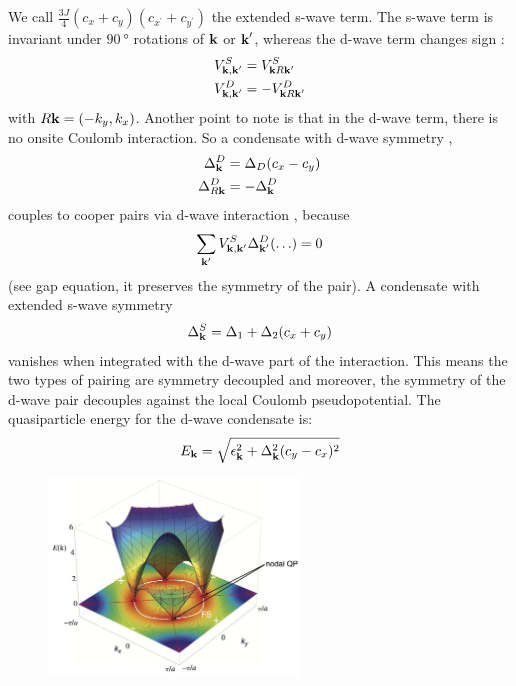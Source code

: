 \documentclass[../main.tex]{subfiles}
\begin{document}
We call \(\frac{3 J}{4} (c_x  + c_y)(c_{x^{\prime}} + c_{y^{\prime}})\) the extended s-wave term.
The s-wave term is invariant under \(\SI{90}{\degree}\) rotations of \(\bm{\mathrm{k}}\) or \(\bm{\mathrm{k}}^{\prime}\), whereas the d-wave term changes sign :
\begin{align}
    V_{\bm{\mathrm{k}}, \bm{\mathrm{k}}^{\prime}}^S &= V_{\bm{\mathrm{k}} R\bm{\mathrm{k}}^{\prime}}^S \\
    V_{\bm{\mathrm{k}}, \bm{\mathrm{k}}^{\prime}}^D &= -V_{\bm{\mathrm{k}} R\bm{\mathrm{k}}^{\prime}}^D
\end{align}
with \(R\bm{\mathrm{k}} = (-k_y, k_x)\).
Another point to note is that in the d-wave term, there is no onsite Coulomb interaction.
So a condensate with d-wave symmetry ,
\begin{align}
    \Delta_{\bm{\mathrm{k}}}^D &= \Delta_D (c_x - c_y) \\
    \Delta_{R\bm{\mathrm{k}}}^D &= -\Delta_{\bm{\mathrm{k}}}^D
\end{align}
couples to cooper pairs via d-wave interaction , because
\begin{equation}
    \sum_{\bm{\mathrm{k}}^{\prime}} V_{\bm{\mathrm{k}}, \bm{\mathrm{k}}^{\prime}}^S \Delta_{\bm{\mathrm{k}}^{\prime}}^D (\ldots) = 0
\end{equation}
(see gap equation, it preserves the symmetry of the pair).
A condensate with extended s-wave symmetry
\begin{equation}
    \Delta_{\bm{\mathrm{k}}}^S = \Delta_1 + \Delta_2 (c_x + c_y)
\end{equation}
vanishes when integrated with the d-wave part of the interaction.
This means the two types of pairing are symmetry decoupled and moreover, the symmetry of the d-wave pair decouples against the local Coulomb pseudopotential.
The quasiparticle  energy for the d-wave condensate is:
\begin{equation}
    E_{\bm{\mathrm{k}}} = \sqrt{\epsilon_{\bm{\mathrm{k}}}^2 + \Delta_{\bm{\mathrm{k}}}^2 (c_y - c_x)^2}
\end{equation}
\begin{figure}[ht]
    \centering
    \includegraphics[width=0.6\textwidth]{notes/images/energy dispersion d-wave}
    \caption{}
    \label{fig:d-wave dispersion}
\end{figure}
\end{document}
